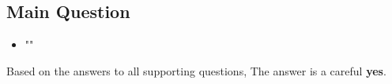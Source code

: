 



\subsection*{Main Question}

\begin{itemize}[ ]
    \item "\myNewMainRQ"
\end{itemize}

Based on the answers to all supporting questions, The answer is a careful \textbf{yes}.

